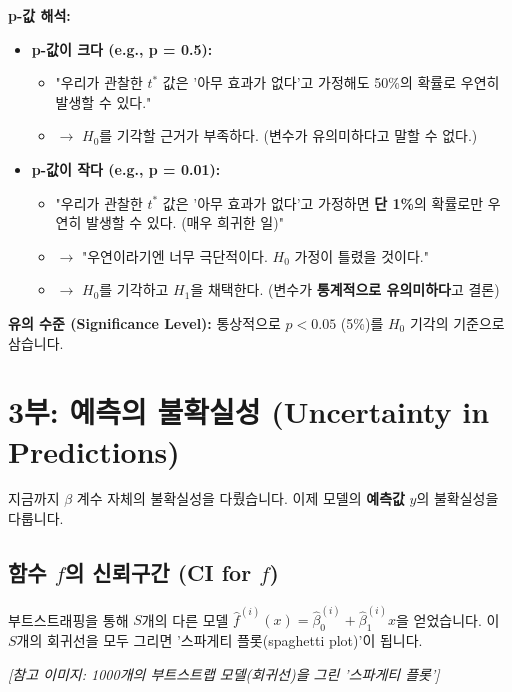 \documentclass[11pt,a4paper]{book}
\theoremstyle{definition}
\begin{document}
\textbf{p-값 해석:}
\begin{itemize}
    \item \textbf{p-값이 크다 (e.g., p = 0.5):}
        \begin{itemize}
            \item "우리가 관찰한 $t^*$ 값은 '아무 효과가 없다'고 가정해도 50\%의 확률로 우연히 발생할 수 있다."
            \item $\rightarrow$ $H_0$를 기각할 근거가 부족하다. (변수가 유의미하다고 말할 수 없다.)
        \end{itemize}
    \item \textbf{p-값이 작다 (e.g., p = 0.01):}
        \begin{itemize}
            \item "우리가 관찰한 $t^*$ 값은 '아무 효과가 없다'고 가정하면 \textbf{단 1\%}의 확률로만 우연히 발생할 수 있다. (매우 희귀한 일)"
            \item $\rightarrow$ "우연이라기엔 너무 극단적이다. $H_0$ 가정이 틀렸을 것이다."
            \item $\rightarrow$ $H_0$를 기각하고 $H_1$을 채택한다. (변수가 \textbf{통계적으로 유의미하다}고 결론)
        \end{itemize}
\end{itemize}

\textbf{유의 수준 (Significance Level):} 통상적으로 $p < 0.05$ (5\%)를 $H_0$ 기각의 기준으로 삼습니다.


\section{3부: 예측의 불확실성 (Uncertainty in Predictions)}

지금까지 $\beta$ 계수 자체의 불확실성을 다뤘습니다. 이제 모델의 \textbf{예측값} $\hat{y}$의 불확실성을 다룹니다.

\subsection{함수 $f$의 신뢰구간 (CI for $f$)}

부트스트래핑을 통해 $S$개의 다른 모델 $\hat{f}^{(i)}(x) = \hat{\beta}_0^{(i)} + \hat{\beta}_1^{(i)} x$을 얻었습니다. 이 $S$개의 회귀선을 모두 그리면 '스파게티 플롯(spaghetti plot)'이 됩니다.

\textit{[참고 이미지: 1000개의 부트스트랩 모델(회귀선)을 그린 '스파게티 플롯']}
\end{document}
